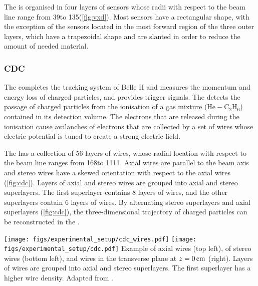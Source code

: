 The \SVD is organised in four layers of sensors whose radii with respect to the beam line range from 39\mm to 135\mm (\cref{fig:vxd}).
Most sensors have a rectangular shape, with the exception of the sensors located in the most forward region of the three outer layers, which have a trapezoidal shape and are slanted in order to reduce the amount of needed material.


\subsubsection*{CDC}

The \CDC completes the tracking system of Belle II and measures the momentum and energy loss of charged particles, and provides trigger signals.
The \CDC detects the passage of charged particles from the ionisation of a gas mixture ($\mathrm{He-C_2H_6}$) contained in its detection volume.
The electrons that are released during the ionisation cause avalanches of electrons that are collected by a set of wires whose electric potential is tuned to create a strong electric field.

The \CDC has a collection of 56 layers of wires, whose radial location with respect to the beam line ranges from 168\mm to 1111\mm.
Axial wires are parallel to the beam axis and stereo wires have a skewed orientation with respect to the axial wires (\cref{fig:cdc}).
Layers of axial and stereo wires are grouped into axial and stereo superlayers.
The first superlayer contains 8 layers of wires, and the other superlayers contain 6 layers of wires.
By alternating stereo superlayers and axial superlayers (\cref{fig:cdc}), the three-dimensional trajectory of charged particles can be reconstructed in the \CDC.

{
\texttt{[image: figs/experimental\_setup/cdc\_wires.pdf]}
\hspace{0.05\textwidth}
\texttt{[image: figs/experimental\_setup/cdc.pdf]}
}
{
Example of axial wires (top left), of stereo wires (bottom left), and \CDC wires in the transverse plane at $z=0\mathrm{\,cm}$ (right).
Layers of wires are grouped into axial and stereo superlayers.
The first superlayer has a higher wire density.
Adapted from \cite{Braun:2018hfw, Bertacchi2021}.}
 
